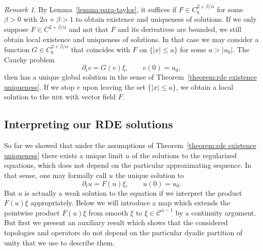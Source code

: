 \documentclass[a4paper,11pt]{article}
\theoremstyle{remark}
\newtheorem{remark}[theorem]{Remark}
\newcommand{\CC}{\ensuremath{\mathscr{C}}}
\begin{document}
\begin{remark}
  By Lemma~\ref{lemma:para-taylor}, it suffices if $F \in C^{2+\beta/\alpha}_b$ for some $\beta >0$ with $2\alpha+\beta>1$ to obtain existence and uniqueness of solutions. If we only suppose $F \in C^{2+\beta/\alpha}$ and not that $F$ and its derivatives are
  bounded, we still obtain local existence and uniqueness of solutions. In
  that case we may consider a function $G \in C^{2+\beta/\alpha}_{b}$ that coincides with
  $F$ on $\{ | x | \leqslant a \}$ for some $a> | u_{0} |$. The Cauchy problem
  \[
     \partial_{t} v=G ( v ) \xi , \hspace{2em} v ( 0 ) =u_{0},
  \]
  then has a unique global solution in the sense of Theorem~\ref{theorem:rde
  existence uniqueness}. If we stop $v$ upon leaving the set $\{ | x | \leqslant a \}$, we obtain a local solution to the \textsc{rde} with vector field $F$.
\end{remark}


\subsection{Interpreting our RDE solutions}

  So far we showed that under the assumptions of Theorem~\ref{theorem:rde existence uniqueness} there exists a unique limit $u$ of the solutions to the
  regularized equations, which does not depend on the particular approximating
  sequence. In that sense, one may formally call $u$ the unique solution to
  \[
     \partial_{t} u=F ( u ) \xi , \hspace{2em} u ( 0 ) =u_{0} .
  \]
  But $u$ is actually a weak solution to the equation if we interpret the product $F(u) \xi$ appropriately. Below we will introduce a map which extends the pointwise product $F(u) \xi$ from smooth $\xi$ to $\xi \in \CC^{\alpha-1}$ by a continuity argument. But first we present an auxiliary result which shows that the considered topologies and operators do not depend on the particular dyadic
partition of unity that we use to describe them.
\end{document}
